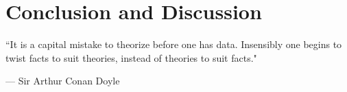 %
%
%
%


\chapter{Conclusion and Discussion}
	\label{conclusion_chapter}
	\vspace{-0.2in}

	\begin{quoting}
		\noindent \large ``It is a capital mistake to theorize before one has data. Insensibly one begins to twist facts to suit theories, instead of theories to suit facts." \normalsize

		--- Sir Arthur Conan Doyle
	\end{quoting}

	\filler


